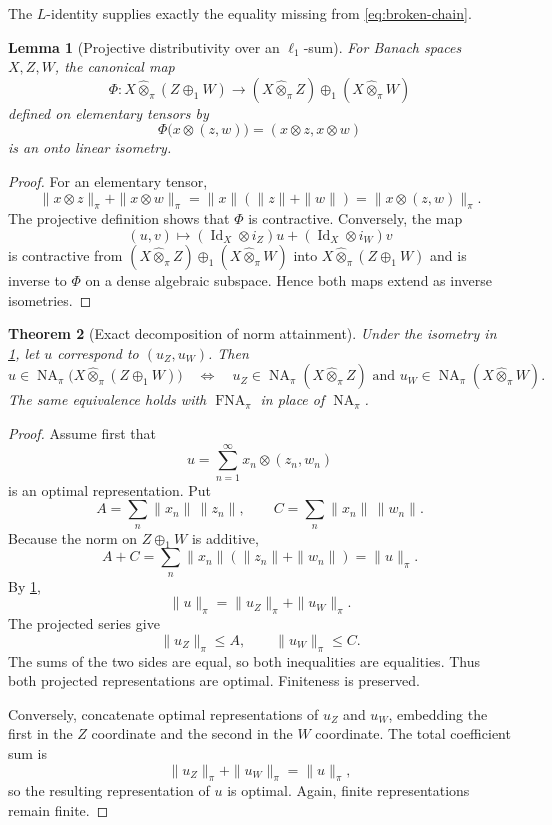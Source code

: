 \documentclass[11pt]{article}
\newtheorem{theorem}{Theorem}[section]
\newtheorem{lemma}[theorem]{Lemma}
\theoremstyle{definition}
\theoremstyle{remark}
\newcommand{\whot}{\widehat\otimes_\pi}
\newcommand{\NA}{\operatorname{NA}_\pi}
\newcommand{\FNA}{\operatorname{FNA}_\pi}
\newcommand{\Id}{\operatorname{Id}}
\begin{document}
The $L$-identity supplies exactly the equality missing from \eqref{eq:broken-chain}.

\begin{lemma}[Projective distributivity over an $\ell_1$-sum]\label{lem:l1-distribution}
For Banach spaces $X,Z,W$, the canonical map
\[
 \Phi:X\whot(Z\oplus_1W)
 \longrightarrow
 (X\whot Z)\oplus_1(X\whot W)
\]
defined on elementary tensors by
\[
 \Phi\bigl(x\otimes(z,w)\bigr)=(x\otimes z,x\otimes w)
\]
is an onto linear isometry.
\end{lemma}

\begin{proof}
For an elementary tensor,
\[
 \|x\otimes z\|_\pi+\|x\otimes w\|_\pi
 =\|x\|(\|z\|+\|w\|)
 =\|x\otimes(z,w)\|_\pi.
\]
The projective definition shows that $\Phi$ is contractive.  Conversely, the map
\[
 (u,v)\longmapsto (\Id_X\otimes i_Z)u+(\Id_X\otimes i_W)v
\]
is contractive from $(X\whot Z)\oplus_1(X\whot W)$ into $X\whot(Z\oplus_1W)$ and is inverse to $\Phi$ on a dense algebraic subspace.  Hence both maps extend as inverse isometries.
\end{proof}

\begin{theorem}[Exact decomposition of norm attainment]\label{thm:l1-NA}
Under the isometry in \cref{lem:l1-distribution}, let $u$ correspond to $(u_Z,u_W)$.  Then
\[
 u\in\NA\bigl(X\whot(Z\oplus_1W)\bigr)
\quad\Longleftrightarrow\quad
 u_Z\in\NA(X\whot Z)
 \text{ and }
 u_W\in\NA(X\whot W).
\]
The same equivalence holds with $\FNA$ in place of $\NA$.
\end{theorem}

\begin{proof}
Assume first that
\[
 u=\sum_{n=1}^\infty x_n\otimes(z_n,w_n)
\]
is an optimal representation.  Put
\[
 A=\sum_n\|x_n\|\,\|z_n\|,
 \qquad
 C=\sum_n\|x_n\|\,\|w_n\|.
\]
Because the norm on $Z\oplus_1W$ is additive,
\[
 A+C
 =\sum_n\|x_n\|(\|z_n\|+\|w_n\|)
 =\|u\|_\pi.
\]
By \cref{lem:l1-distribution},
\[
 \|u\|_\pi=\|u_Z\|_\pi+\|u_W\|_\pi.
\]
The projected series give
\[
 \|u_Z\|_\pi\leq A,
 \qquad
 \|u_W\|_\pi\leq C.
\]
The sums of the two sides are equal, so both inequalities are equalities.  Thus both projected representations are optimal.  Finiteness is preserved.

Conversely, concatenate optimal representations of $u_Z$ and $u_W$, embedding the first in the $Z$ coordinate and the second in the $W$ coordinate.  The total coefficient sum is
\[
 \|u_Z\|_\pi+\|u_W\|_\pi=\|u\|_\pi,
\]
so the resulting representation of $u$ is optimal.  Again, finite representations remain finite.
\end{proof}
\end{document}
